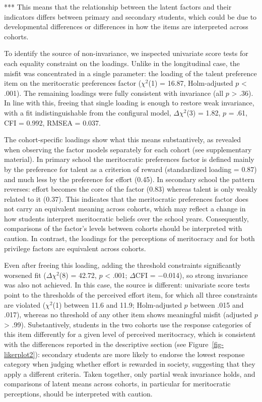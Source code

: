 \documentclass[
  13pt,
]{article}
\begin{document}
*** This means that the relationship between the latent factors and
their indicators differs between primary and secondary students, which
could be due to developmental differences or differences in how the
items are interpreted across cohorts.

To identify the source of non-invariance, we inspected univariate score
tests for each equality constraint on the loadings. Unlike in the
longitudinal case, the misfit was concentrated in a single parameter:
the loading of the talent preference item on the meritocratic
preferences factor (\(\chi^2\)(1) = 16.87, Holm-adjusted \(p\)
\textless{} .001). The remaining loadings were fully consistent with
invariance (all \(p\) \textgreater{} .36). In line with this, freeing
that single loading is enough to restore weak invariance, with a fit
indistinguishable from the configural model, \(\Delta \chi^2\)(3) =
1.82, \(p\) = .61, CFI = 0.992, RMSEA = 0.037.

The cohort-specific loadings show what this means substantively, as
revealed when observing the factor models separately for each cohort
(see supplementary material). In primary school the meritocratic
preferences factor is defined mainly by the preference for talent as a
criterion of reward (standardized loading = 0.87) and much less by the
preference for effort (0.45). In secondary school the pattern reverses:
effort becomes the core of the factor (0.83) whereas talent is only
weakly related to it (0.37). This indicates that the meritocratic
preferences factor does not carry an equivalent meaning across cohorts,
which may reflect a change in how students interpret meritocratic
beliefs over the school years. Consequently, comparisons of the factor's
levels between cohorts should be interpreted with caution. In contrast,
the loadings for the perceptions of meritocracy and for both privilege
factors are equivalent across cohorts.

Even after freeing this loading, adding the threshold constraints
significantly worsened fit (\(\Delta \chi^2\)(8) = 42.72, \(p\)
\textless{} .001; \(\Delta\)CFI = −0.014), so strong invariance was also
not achieved. In this case, the source is different: univariate score
tests point to the thresholds of the perceived effort item, for which
all three constraints are violated (\(\chi^2\)(1) between 11.6 and 11.9;
Holm-adjusted \(p\) between .015 and .017), whereas no threshold of any
other item shows meaningful misfit (adjusted \(p\) \textgreater{} .99).
Substantively, students in the two cohorts use the response categories
of this item differently for a given level of perceived meritocracy,
which is consistent with the differences reported in the descriptive
section (see Figure~\ref{fig-likerplot2}): secondary students are more
likely to endorse the lowest response category when judging whether
effort is rewarded in society, suggesting that they apply a different
criteria. Taken together, only partial weak invariance holds, and
comparisons of latent means across cohorts, in particular for
meritocratic perceptions, should be interpreted with caution.
\end{document}
